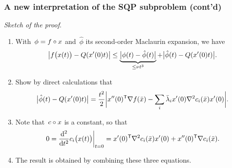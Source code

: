 \documentclass{polyu-presentation}
\newcommand{\con}[1][]{c\ifthenelse{\equal{#1}{}}{}{_{#1}}}
\newcommand{\iter}[1][]{x\ifthenelse{\equal{#1}{}}{}{^{#1}}}
\newcommand{\lm}[1][]{\lambda\ifthenelse{\equal{#1}{}}{}{^{#1}}}
\newcommand{\obj}{f}
\begin{document}
\begin{frame}
    \frametitle{A new interpretation of the SQP subproblem (cont'd)}

    \emph{Sketch of the proof}.
    \begin{enumerate}
        \item With~$\phi = \obj \circ \iter$ and~$\hat{\phi}$ its second-order Maclaurin expansion, we have
        \begin{equation*}
            \abs[\big]{\obj \big(\iter(t) \big) - Q(\iter'(0) t)} \le \underbrace{\abs[\big]{\phi(t) - \hat{\phi}(t)}}_{\le \nu t^3} + \abs[\big]{\hat{\phi}(t) - Q(\iter'(0) t)}.
        \end{equation*}
        \item Show by direct calculations that
        \begin{equation*}
            \abs[\big]{\hat{\phi}(t) - Q(\iter'(0) t)} = \frac{t^2}{2} \abs[\bigg]{\iter''(0)^{\T} \nabla \obj(\bar{\iter}) - \sum_i \bar{\lm}_i \iter'(0) \nabla^2 \con[i](\bar{\iter}) \iter'(0)}.
        \end{equation*}
        \item Note that~$\con \circ x$ is a constant, so that
        \begin{equation*}
            0 = \frac{\du^2}{\du t^2} \con[i] \big( \iter(t) \big) \bigg\vert_{t = 0} = \iter'(0)^{\T} \nabla^2 \con[i](\bar{\iter}) \iter'(0) + \iter''(0)^{\T} \nabla \con[i](\bar{\iter}).
        \end{equation*}
        \item The result is obtained by combining these three equations.
    \end{enumerate}
\end{frame}
\end{document}
